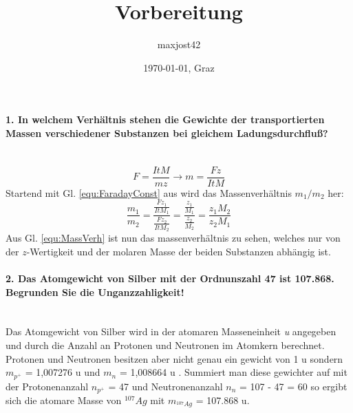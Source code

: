 \documentclass[headheight=30pt]{scrartcl}
\date{\today{}, Graz}
\author{maxjost42}
\title{Vorbereitung}
\begin{document}
\newpage
\paragraph{1. In welchem Verhältnis stehen die Gewichte der transportierten Massen verschiedener Substanzen bei gleichem Ladungsdurchfluß?} ~
\begin{equation}
    F = \frac{ItM}{mz} \rightarrow m = \frac{Fz}{ItM}
    \label{equ:FaradayConst}
\end{equation}
Startend mit Gl. \ref{equ:FaradayConst} aus \cite{LAB} wird das Massenverhältnis $m_1/m_2$ her:
\begin{equation}
    \frac{m_1}{m_2} = \frac{\frac{Fz_1}{ItM_1}}{\frac{Fz_2}{ItM_2}} = \frac{\frac{z_1}{M_1}}{\frac{z_2}{M_2}} = \frac{z_1M_2}{z_2M_1}
    \label{equ:MassVerh}
\end{equation}
Aus Gl. \ref{equ:MassVerh} ist nun das massenverhältnis zu sehen, welches nur von der $z$-Wertigkeit und der molaren Masse der beiden Substanzen abhängig ist.


\paragraph{2. Das Atomgewicht von Silber mit der Ordnunszahl 47 ist 107.868. Begrunden Sie die Unganzzahligkeit!} ~ \\
Das Atomgewicht von Silber wird in der atomaren Masseneinheit \textit{u} \cite{ATOMM} angegeben und durch die Anzahl an Protonen und Neutronen im Atomkern berechnet.
Protonen und Neutronen besitzen aber nicht genau ein gewicht von 1 u sondern $m_{p^+}$ = 1,007276 u \cite{PROTM} und $m_n$ = 1,008664 u \cite{NEUTM}.
Summiert man diese gewichter auf mit der Protonenanzahl $n_{p^+}$ = 47 und Neutronenanzahl $n_{n}$ = 107 - 47 = 60 so ergibt sich die atomare Masse von $^{107}Ag$ mit $m_{^{107}Ag}$ = 107.868 u.
\end{document}
